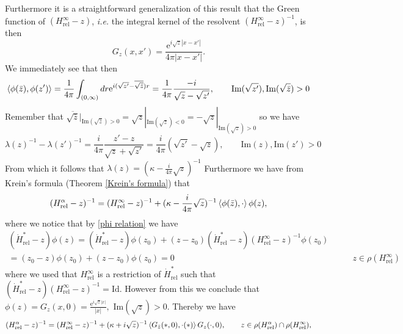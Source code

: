 \documentclass[a4paper,11pt]{article}
\newcommand{\euler}[1]{\text{e}^{#1}}
\newcommand{\Imag}{\text{Im}}
\newcommand{\ie}{\emph{i.e.} }
\begin{document}
Furthermore it is a straightforward generalization of this result that the Green function of $ (H_{\text{rel}}^\infty-z) $, \ie the integral kernel of the resolvent $ (H_{\text{rel}}^\infty-z)^{-1} $, is then \begin{equation}
G_z(x,x')=\frac{\euler{i\sqrt{z}|x-x'|}}{4\pi|x-x'|}.
\end{equation}
We immediately see that then\begin{equation}
\braket{\phi(\bar{z}),\phi(z')}=\frac{1}{4\pi}\int_{(0,\infty)}dr\euler{i(\sqrt{z'}-\overline{\sqrt{\bar{z}}})r}=\frac{1}{4\pi}\frac{-i}{\sqrt{z}-\sqrt{z'}},\qquad \Imag(\sqrt{z'}),\Imag(\sqrt{\bar{z}})>0
\end{equation}
Remember that $ \overline{\sqrt{\bar{z}}}\rvert_{\Imag(\sqrt{\bar{z}})>0}=\sqrt{z}|_{\Imag(\sqrt{z})<0}=-\sqrt{z}|_{\Imag(\sqrt{z})>0} $
so we have \begin{equation}
\lambda(z)^{-1}-\lambda(z')^{-1}=\frac{i}{4\pi}\frac{z'-z}{\sqrt{z}+\sqrt{z'}}=\frac{i}{4\pi}(\sqrt{z'}-\sqrt{z}),\qquad \Imag(z),\Imag(z')>0
\end{equation}
From which it follows that $ \lambda(z)=(\kappa-\frac{i}{4\pi}\sqrt{z})^{-1} $ Furthermore we have from Krein's formula (Theorem \ref{Krein's formula}) that \begin{equation}
(H_{\text{rel}}^\alpha-z)^{-1}=(H_{\text{rel}}^\infty-z)^{-1}+(\kappa-\frac{i}{4\pi}\sqrt{z})^{-1}\braket{\phi(\bar{z}),\cdot}\phi(z),
\end{equation}
where we notice that by \eqref{phi relation} we have\begin{equation}
\begin{aligned}
(\dot{H}_{\text{rel}}^*-z)\phi(z)=(\dot{H}_{\text{rel}}^*-z)\phi(z_0)+(z-z_0)(\dot{H}_{\text{rel}}^*-z)(H_{\text{rel}}^\infty-z)^{-1}\phi(z_0)&\\
=(z_0-z)\phi(z_0)+(z-z_0)\phi(z_0)=0&\qquad z\in\rho(H_{\text{rel}}^\infty)
\end{aligned}
\end{equation}
where we used that $ H_{\text{rel}}^\infty $ is a restriction of $ \dot{H}_{\text{rel}}^* $ such that $ (\dot{H}_{\text{rel}}^*-z)(H_{\text{rel}}^\infty-z)^{-1}=\text{Id} $. However from this we conclude that $ \phi(z)=G_{z}(x,0)=\frac{\euler{i\sqrt{z}|x|}}{|x|}, $ $ \Imag(\sqrt{z})>0 $. Thereby we have \begin{equation}
(H_{\text{rel}}^\alpha-z)^{-1}=(H_{\text{rel}}^\infty-z)^{-1}+(\kappa+i\sqrt{z})^{-1}\braket{G_{\bar{z}}(\ast,0),\cdot(\ast)}G_z(\cdot,0),\qquad z\in\rho(H_{\text{rel}}^\alpha)\cap\rho(H_{\text{rel}}^\infty),
\end{equation}
\end{document}
